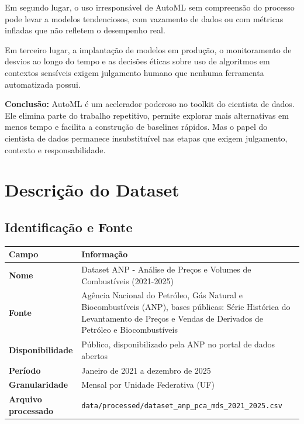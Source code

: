 \documentclass[11pt, a4paper, oneside]{article}
\newcommand{\taltrow}{\rowcolor{tablealt}}
\begin{document}
Em segundo lugar, o uso irresponsável de AutoML sem compreensão do processo pode
levar a modelos tendenciosos, com vazamento de dados ou com métricas infladas que
não refletem o desempenho real.

Em terceiro lugar, a implantação de modelos em produção, o monitoramento de desvios
ao longo do tempo e as decisões éticas sobre uso de algoritmos em contextos sensíveis
exigem julgamento humano que nenhuma ferramenta automatizada possui.

\begin{infobox}
\textbf{Conclusão:} AutoML é um acelerador poderoso no toolkit do cientista de dados.
Ele elimina parte do trabalho repetitivo, permite explorar mais alternativas em menos
tempo e facilita a construção de baselines rápidos. Mas o papel do cientista de dados
permanece insubstituível nas etapas que exigem julgamento, contexto e responsabilidade.
\end{infobox}

\newpage

\section{Descrição do Dataset}
\label{sec:dataset}

\subsection{Identificação e Fonte}
\label{sec:dataset-fonte}

\begin{tabularx}{\textwidth}{@{}L{4.5cm} Y@{}}
  \toprule
  \textbf{Campo} & \textbf{Informação} \\
  \midrule
  \taltrow \textbf{Nome} & Dataset ANP - Análise de Preços e Volumes de Combustíveis (2021-2025) \\
  \textbf{Fonte} & Agência Nacional do Petróleo, Gás Natural e Biocombustíveis (ANP), bases públicas: Série Histórica do Levantamento de Preços e Vendas de Derivados de Petróleo e Biocombustíveis \\
  \taltrow \textbf{Disponibilidade} & Público, disponibilizado pela ANP no portal de dados abertos \\
  \textbf{Período} & Janeiro de 2021 a dezembro de 2025 \\
  \taltrow \textbf{Granularidade} & Mensal por Unidade Federativa (UF) \\
  \textbf{Arquivo processado} & \texttt{data/processed/dataset\_anp\_pca\_mds\_2021\_2025.csv} \\
  \bottomrule
\end{tabularx}
\end{document}
